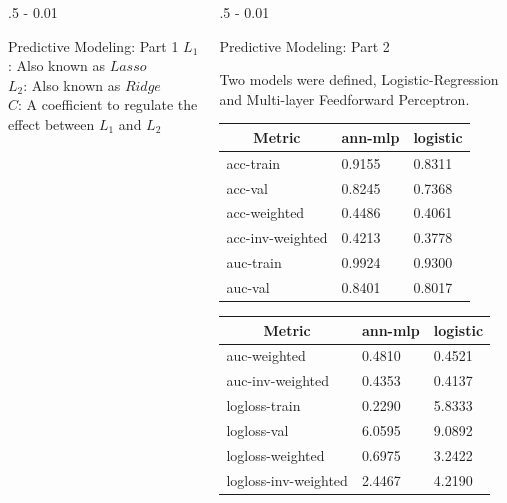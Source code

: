 \documentclass{postertheme}\usepackage[]{graphicx}\usepackage[]{color}
\begin{document}
\begin{frame}
\begin{columns}[onlytextwidth]
\begin{column}{.5 \textwidth - 0.01 \textwidth}
\begin{block}{Predictive Modeling: Part 1}
      \footnotesize
      \noindent
      $L_{1}$: Also known as $Lasso$  \\
      $L_{2}$: Also known as $Ridge$ \\
      $C$: A coefficient to regulate the effect between $L_{1}$ and $L_{2}$
        
    \end{block}
  \end{column}

  \begin{column}{.5 \textwidth - 0.01 \textwidth}
    \begin{block}{Predictive Modeling: Part 2}
    
      Two models were defined, Logistic-Regression and Multi-layer Feedforward Perceptron. 
      
      \begin{table}[h]
      \small
      \begin{minipage}[h]{0.49\textwidth}
        \centering
        \begin{tabular}{@{}lll@{}}
            \hline
            \multicolumn{1}{c}{\textbf{Metric}} & \multicolumn{1}{c}{\textbf{ann-mlp}} &
            \multicolumn{1}{c}{\textbf{logistic}} \\ \hline
            acc-train & 0.9155 & 0.8311 \\ \hline
            acc-val & 0.8245 & 0.7368 \\ \hline
            acc-weighted & 0.4486 & 0.4061 \\ \hline
            acc-inv-weighted & 0.4213 & 0.3778 \\ \hline
            auc-train & 0.9924 & 0.9300 \\ \hline
            auc-val & 0.8401 & 0.8017 \\ \hline
        \end{tabular}
      \end{minipage}
      \begin{minipage}[h]{0.49\textwidth}
        \centering
        \begin{tabular}{@{}lll@{}}
            \hline
            \multicolumn{1}{c}{\textbf{Metric}} & \multicolumn{1}{c}{\textbf{ann-mlp}} &
            \multicolumn{1}{c}{\textbf{logistic}} \\ \hline
            auc-weighted & 0.4810 & 0.4521 \\ \hline
            auc-inv-weighted & 0.4353 & 0.4137 \\ \hline
            logloss-train & 0.2290 & 5.8333 \\ \hline
            logloss-val & 6.0595 & 9.0892 \\ \hline
            logloss-weighted & 0.6975 & 3.2422 \\ \hline
            logloss-inv-weighted & 2.4467 & 4.2190 \\ \hline
        \end{tabular}
      \end{minipage}
\end{table}
      

\end{block}
\end{column}
\end{columns}
\end{frame}
\end{document}

